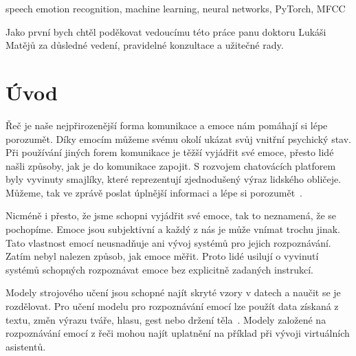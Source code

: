 \documentclass[FM,BP]{tulthesis}
\newcommand{\note}[1]{\todo[color=blue!40]{#1}}
\begin{document}
\begin{keywordsEN}
speech emotion recognition, machine learning, neural networks, PyTorch, MFCC
\end{keywordsEN}

\clearpage

\begin{acknowledgement}
Jako první bych chtěl poděkovat vedoucímu této práce panu doktoru Lukáši Matějů za důsledné vedení, pravidelné konzultace a užitečné rady.
\end{acknowledgement}

\note{Seznam nebýt v obsahu}
\tableofcontents

\renewcommand{\listfigurename}{Seznam obrázků}
\renewcommand{\listtablename}{Seznam tabulek}

\thispagestyle{empty}
\listoffigures
\listoftables


\chapter{Úvod} %
Řeč je naše nejpřirozenější forma komunikace a emoce nám pomáhají si lépe porozumět. Díky emocím můžeme svému okolí ukázat svůj vnitřní psychický stav. Při používání jiných forem komunikace je těžší vyjádřit své emoce, přesto lidé našli způsoby, jak je do komunikace zapojit. S rozvojem chatovácích platforem byly vyvinuty smajlíky, které reprezentují zjednodušený výraz lidského obličeje. Můžeme, tak ve zprávě poslat úplnější informaci a lépe si porozumět~\cite{DBLP:journals/speech/AkcayO20}.

Nicméně i přesto, že jsme schopni vyjádřit své emoce, tak to neznamená, že se pochopíme. Emoce jsou subjektivní a každý z nás je může vnímat trochu jinak. Tato vlastnost emocí neusnadňuje ani vývoj systémů pro jejich rozpoznávání. Zatím nebyl nalezen způsob, jak emoce měřit. Proto lidé usilují o vyvinutí systémů schopných rozpoznávat emoce bez explicitně zadaných instrukcí.

Modely strojového učení jsou schopné najít skryté vzory v datech a naučit se je rozdělovat. Pro učení modelu pro rozpoznávání emocí lze použít data získaná z textu, změn výrazu tváře, hlasu, gest nebo držení těla~\cite{konar_chakraborty_2015}. Modely založené na rozpoznávání emocí z řeči mohou najít uplatnění na příklad při vývoji virtuálních asistentů.
\end{document}
